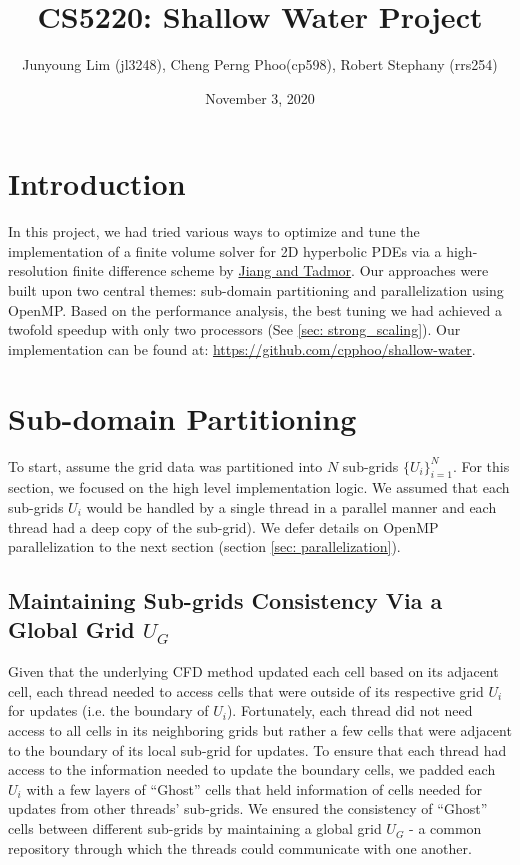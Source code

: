 \documentclass{article}
\title{CS5220: Shallow Water Project}
\author{Junyoung Lim (jl3248), Cheng Perng Phoo(cp598), Robert Stephany (rrs254)}
\date{November 3, 2020}
\begin{document}
\maketitle

\section{Introduction}

In this project, we had tried various ways to optimize and tune the implementation of a finite volume solver for 2D hyperbolic PDEs via a high-resolution finite difference scheme by \href{http://www.cscamm.umd.edu/tadmor/pub/central-schemes/Jiang-Tadmor.SISSC-98.pdf}{Jiang and Tadmor}.
Our approaches were built upon two central themes: sub-domain partitioning and parallelization using OpenMP. 
Based on the performance analysis, the best tuning we had achieved a twofold speedup with only two processors (See \ref{sec: strong_scaling}). Our implementation can be found at: \url{https://github.com/cpphoo/shallow-water}.

\section{Sub-domain Partitioning}
\label{sec: subdomain_partitioning}
To start, assume the grid data was partitioned into $N$ sub-grids $\{U_i\}_{i=1}^N$.
For this section, we focused on the high level implementation logic. We assumed 
that each sub-grids $U_i$ would be handled by a single thread in a parallel manner and 
each thread had a deep copy of the sub-grid). 
We defer details on OpenMP parallelization to the next section (section \ref{sec: parallelization}). 

\subsection{Maintaining Sub-grids Consistency Via a Global Grid $U_G$}

Given that the underlying CFD method updated each cell based on its adjacent cell, each thread needed to access cells that were outside of its respective grid $U_i$ for updates (i.e. the boundary of $U_i$). 
Fortunately, each thread did not need access to all cells in its neighboring grids but rather a few cells that were adjacent to the boundary of its local sub-grid for updates.
To ensure that each thread had access to the information needed to update the boundary cells, we padded each $U_i$ with a few layers of ``Ghost'' cells that held information of cells 
needed for updates from other threads' sub-grids. We ensured the consistency of ``Ghost'' cells between different sub-grids by maintaining a global grid $U_G$ - a common repository 
through which the threads could communicate with one another.
\end{document}
